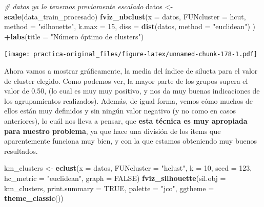 \documentclass[spanish,]{article}
\newenvironment{Shaded}{\begin{snugshade}}{\end{snugshade}}
\newcommand{\KeywordTok}[1]{\textcolor[rgb]{0.13,0.29,0.53}{\textbf{#1}}}
\newcommand{\DataTypeTok}[1]{\textcolor[rgb]{0.13,0.29,0.53}{#1}}
\newcommand{\DecValTok}[1]{\textcolor[rgb]{0.00,0.00,0.81}{#1}}
\newcommand{\StringTok}[1]{\textcolor[rgb]{0.31,0.60,0.02}{#1}}
\newcommand{\CommentTok}[1]{\textcolor[rgb]{0.56,0.35,0.01}{\textit{#1}}}
\newcommand{\OtherTok}[1]{\textcolor[rgb]{0.56,0.35,0.01}{#1}}
\newcommand{\OperatorTok}[1]{\textcolor[rgb]{0.81,0.36,0.00}{\textbf{#1}}}
\newcommand{\NormalTok}[1]{#1}
\begin{document}
\begin{Shaded}
\begin{Highlighting}[]
\CommentTok{# datos ya lo tenemos previamente escalado }
\NormalTok{datos <-}\StringTok{ }\KeywordTok{scale}\NormalTok{(data_train_procesado)}
\KeywordTok{fviz_nbclust}\NormalTok{(}\DataTypeTok{x =}\NormalTok{ datos, }\DataTypeTok{FUNcluster =}\NormalTok{ hcut, }\DataTypeTok{method =} \StringTok{"silhouette"}\NormalTok{, }\DataTypeTok{k.max =} \DecValTok{15}\NormalTok{,}
             \DataTypeTok{diss =} \KeywordTok{dist}\NormalTok{(datos, }\DataTypeTok{method =} \StringTok{"euclidean"}\NormalTok{) ) }\OperatorTok{+}\KeywordTok{labs}\NormalTok{(}\DataTypeTok{title =} \StringTok{"Número óptimo de clusters"}\NormalTok{)}
\end{Highlighting}
\end{Shaded}

\texttt{[image: practica-original\_files/figure-latex/unnamed-chunk-178-1.pdf]}

Ahora vamos a mostrar gráficamente, la media del índice de silueta para
el valor de cluster elegido. Como podemos ver, la mayor parte de los
grupos supera el valor de 0.50, (lo cual es muy muy positivo, y nos da
muy buenas indicaciones de los agrupamientos realizados). Además, de
igual forma, vemos cómo muchos de ellos están muy definidos y sin ningún
valor negativo (y no como en casos anteriores), lo cuál nos lleva a
pensar, que \textbf{esta técnica es muy apropiada para nuestro
problema}, ya que hace una división de los items que aparentemente
funciona muy bien, y con la que estamos obteniendo muy buenos
resultados.

\begin{Shaded}
\begin{Highlighting}[]
\NormalTok{km_clusters <-}\StringTok{ }\KeywordTok{eclust}\NormalTok{(}\DataTypeTok{x =}\NormalTok{ datos, }\DataTypeTok{FUNcluster =} \StringTok{"hclust"}\NormalTok{, }\DataTypeTok{k =} \DecValTok{10}\NormalTok{, }\DataTypeTok{seed =} \DecValTok{123}\NormalTok{,}
                      \DataTypeTok{hc_metric =} \StringTok{"euclidean"}\NormalTok{,  }\DataTypeTok{graph =} \OtherTok{FALSE}\NormalTok{)}
\KeywordTok{fviz_silhouette}\NormalTok{(}\DataTypeTok{sil.obj =}\NormalTok{ km_clusters, }\DataTypeTok{print.summary =} \OtherTok{TRUE}\NormalTok{, }\DataTypeTok{palette =} \StringTok{"jco"}\NormalTok{,}
                \DataTypeTok{ggtheme =} \KeywordTok{theme_classic}\NormalTok{()) }
\end{Highlighting}
\end{Shaded}
\end{document}
